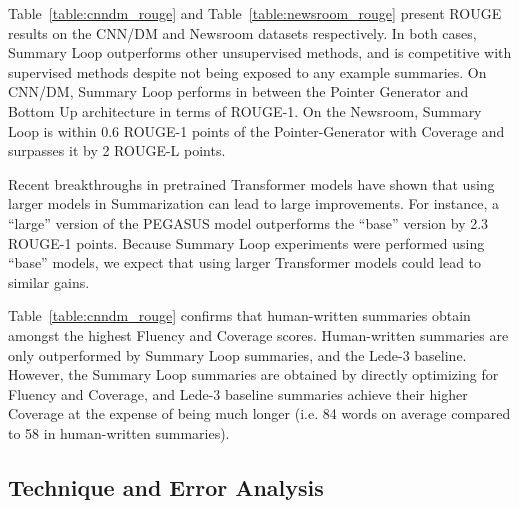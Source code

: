 \documentclass[11pt,a4paper]{article}
\begin{document}
Table~\ref{table:cnndm_rouge} and Table~\ref{table:newsroom_rouge} present ROUGE results on the CNN/DM and Newsroom datasets respectively. In both cases, Summary Loop outperforms other unsupervised methods, and is competitive with supervised methods despite not being exposed to  any example summaries. On CNN/DM, Summary Loop performs in between the Pointer Generator and Bottom Up architecture in terms of ROUGE-1. On the Newsroom, Summary Loop is within 0.6 ROUGE-1 points of the Pointer-Generator with Coverage and surpasses it by 2 ROUGE-L points.

Recent breakthroughs in pretrained Transformer models have shown that using larger models in Summarization can lead to large improvements. For instance, a ``large'' version of the PEGASUS model \cite{zhang2019pegasus} outperforms the ``base'' version by 2.3 ROUGE-1 points. Because Summary Loop experiments were performed using ``base'' models, we expect that using larger Transformer models could lead to similar gains.

Table~\ref{table:cnndm_rouge} confirms that human-written summaries obtain amongst the highest Fluency and Coverage scores. Human-written summaries are only outperformed by Summary Loop summaries, and the Lede-3 baseline. However, the Summary Loop summaries are obtained by directly optimizing for Fluency and Coverage, and Lede-3 baseline summaries achieve their higher Coverage at the expense of being much longer (i.e. 84 words on average compared to 58 in human-written summaries).

\subsection{Technique and Error Analysis}
\label{section:technique_and_error}
\end{document}
